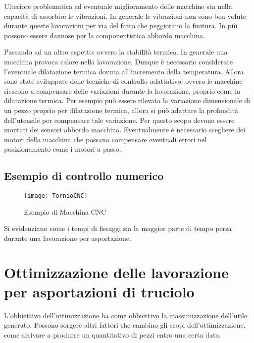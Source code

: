 Ulteriore problematica ed eventuale miglioramento delle macchine sta nella capacità di assorbire le vibrazioni. In generale le vibrazioni non sono ben volute durante queste lavorazioni per via del fatto che peggiorano la finitura. In più possono essere dannose per la componentistica abbordo macchina.

Passando ad un altro aspetto: ovvero la stabilità termica.
In generale una macchina provoca calore nella lavorazione. Dunque è necessario considerare l'eventuale dilatazione termica dovuta all'incremento della temperatura.
Allora sono state sviluppate delle tecniche di controllo adattativo: ovvero le macchine riescono a compensare delle variazioni durante la lavorazione, proprio come la dilatazione termica. 
Per esempio può essere rilevata la variazione dimensionale di un pezzo proprio per dilatazione termica, allora si può adattare la profondità dell'utensile per compensare tale variazione. 
Per questo scopo devono essere montati dei sensori abbordo macchina.
Eventualmente è necessario scegliere dei motori della macchina che possano compensare eventuali errori nel posizionamento come i motori a passo.

\subsection{Esempio di controllo numerico}
\begin{figure}
\centering
\texttt{[image: TornioCNC]}
\caption{Esempio di Macchina CNC}
\label{fig:TornioCNC}
\end{figure}
Si evidenziano come i tempi di fissaggi sia la maggior parte di tempo persa durante una lavorazione per asportazione.

\section{Ottimizzazione delle lavorazione per asportazioni di truciolo}
L'obbiettivo dell'ottimizzazione ha come obbiettivo la massimizzazione dell'utile generato.
Possono sorgere altri fattori che cambino gli scopi dell'ottimizzazione, come arrivare a produrre un quantitativo di pezzi entro una certa data.

